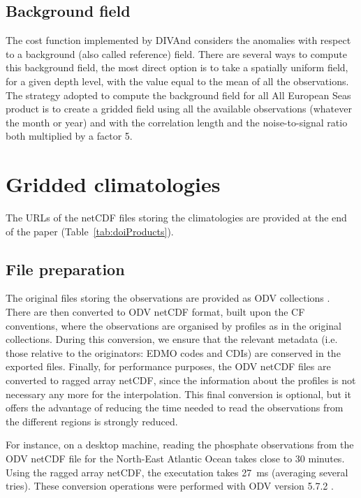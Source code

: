 \documentclass[essd, manuscript]{copernicus}
\begin{document}
\subsection{Background field}

The cost function implemented by DIVAnd considers the anomalies with respect to a background (also called reference) field. There are several ways to compute this background field, the most direct option is to take a spatially uniform field, for a given depth level, with the value equal to the mean of all the observations. The strategy adopted to compute the background field for all All European Seas product is to create a gridded field using all the available observations (whatever the month or year) and with the correlation length and the noise-to-signal ratio both multiplied by a factor 5. 

\section{Gridded climatologies\label{sec:clim}}

The URLs of the netCDF files storing the climatologies are provided at the end of the paper (Table~\ref{tab:doiProducts}).

\subsection{File preparation}

The original files storing the observations are provided as ODV collections \citep[Ocean Data View,][]{SCHLITZER2002}. There are then converted to ODV netCDF format, built upon the CF conventions, where the observations are organised by profiles as in the original collections. During this conversion, we ensure that the relevant metadata (i.e. those relative to the originators: EDMO codes and CDIs) are conserved in the exported files. Finally, for performance purposes, the ODV netCDF files are converted to ragged array netCDF, since the information about the profiles is not necessary any more for the interpolation. This final conversion is optional, but it offers the advantage of reducing the time needed to read the observations from the different regions is strongly reduced.

For instance, on a desktop machine, reading the phosphate observations from the ODV netCDF file for the North-East Atlantic Ocean takes close to 30 minutes. Using the ragged array netCDF, the executation takes 27~ms (averaging several tries). These conversion operations were performed with ODV version 5.7.2 \citep{Schlitzer2024}.
\end{document}
